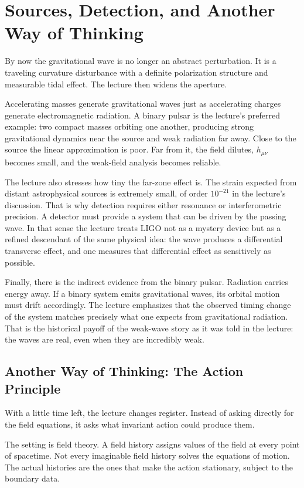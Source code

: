 \section{Sources, Detection, and Another Way of Thinking}

By now the gravitational wave is no longer an abstract perturbation. It is a traveling curvature disturbance with a definite polarization structure and measurable tidal effect. The lecture then widens the aperture.

Accelerating masses generate gravitational waves just as accelerating charges generate electromagnetic radiation. A binary pulsar is the lecture's preferred example: two compact masses orbiting one another, producing strong gravitational dynamics near the source and weak radiation far away. Close to the source the linear approximation is poor. Far from it, the field dilutes, \(h_{\mu\nu}\) becomes small, and the weak-field analysis becomes reliable.

The lecture also stresses how tiny the far-zone effect is. The strain expected from distant astrophysical sources is extremely small, of order \(10^{-21}\) in the lecture's discussion. That is why detection requires either resonance or interferometric precision. A detector must provide a system that can be driven by the passing wave. In that sense the lecture treats LIGO not as a mystery device but as a refined descendant of the same physical idea: the wave produces a differential transverse effect, and one measures that differential effect as sensitively as possible.

Finally, there is the indirect evidence from the binary pulsar. Radiation carries energy away. If a binary system emits gravitational waves, its orbital motion must drift accordingly. The lecture emphasizes that the observed timing change of the system matches precisely what one expects from gravitational radiation. That is the historical payoff of the weak-wave story as it was told in the lecture: the waves are real, even when they are incredibly weak.

\subsection{Another Way of Thinking: The Action Principle}

With a little time left, the lecture changes register. Instead of asking directly for the field equations, it asks what invariant action could produce them.

The setting is field theory. A field history assigns values of the field at every point of spacetime. Not every imaginable field history solves the equations of motion. The actual histories are the ones that make the action stationary, subject to the boundary data.

